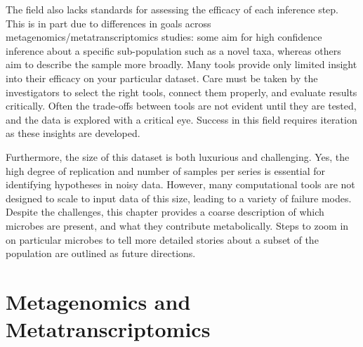 The field also lacks standards for assessing the efficacy of each inference step.
This is in part due to differences in goals across metagenomics/metatranscriptomics studies: some aim for high confidence inference about a specific sub-population such as a novel taxa, whereas others aim to describe the sample more broadly.
Many tools provide only limited insight into their efficacy on your particular dataset.
Care must be taken by the investigators to select the right tools, connect them properly, and evaluate results critically.
Often the trade-offs between tools are not evident until they are tested, and the data is explored with a critical eye.
Success in this field requires iteration as these insights are developed.

Furthermore, the size of this dataset is both luxurious and challenging.
Yes, the high degree of replication and number of samples per series is essential for identifying hypotheses in noisy data.
However, many computational tools are not designed to scale to input data of this size, leading to a variety of failure modes. %
Despite the challenges, this chapter provides a coarse description of which microbes are present, and what they contribute metabolically.
Steps to zoom in on particular microbes to tell more detailed stories about a subset of the population are outlined as future directions.


\section{Metagenomics and Metatranscriptomics}

